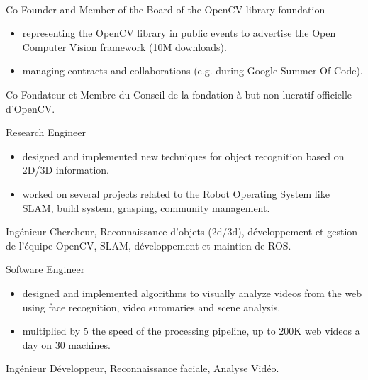 \documentclass{article}
\begin{document}
\begin{llist}
\\
{
Co-Founder and Member of the Board of the OpenCV library foundation
\vspace{-0.33cm}
\begin{itemize}
 \item representing the OpenCV library in public events to advertise the Open Computer Vision framework (10M downloads).
 \item managing contracts and collaborations (e.g. during Google Summer Of Code).
\end{itemize}
}
{
Co-Fondateur et Membre du Conseil de la fondation \`{a} but non lucratif officielle d'OpenCV.
}

{
Research Engineer
\vspace{-0.33cm}
\begin{itemize}
 \item designed and implemented new techniques for object recognition based on 2D/3D information.
 \item worked on several projects related to the Robot Operating System like SLAM, build system, grasping, community 
management.
\end{itemize}
}
{
Ing\'{e}nieur Chercheur, Reconnaissance d'objets (2d/3d), d\'{e}veloppement et gestion de l'\'{e}quipe 
OpenCV, SLAM, d\'{e}veloppement et maintien de ROS.
}

{
Software Engineer
\vspace{-0.33cm}
\begin{itemize}
 \item designed and implemented algorithms to visually analyze videos from the web using face recognition, video 
summaries and scene analysis.
 \item multiplied by 5 the speed of the processing pipeline, up to 200K web videos a day on 30 machines.
\end{itemize}
}
{
Ing\'{e}nieur D\'{e}veloppeur, Reconnaissance faciale, Analyse
Vid\'{e}o.
}



\end{llist}
\end{document}
